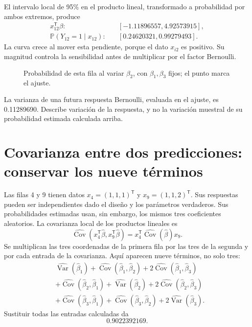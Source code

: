\documentclass[11pt,a4paper]{article}
\newcommand{\Prob}{\mathbb P}
\newcommand{\T}{^{\mathsf T}}
\DeclareMathOperator{\Var}{Var}
\DeclareMathOperator{\Cov}{Cov}
\begin{document}
El intervalo local de 95\% en el producto lineal,
transformado a probabilidad por ambos extremos, produce
\[
\begin{aligned}
x_{12}\T\beta:&\quad[-1.11896557,4.92573915],\\\Prob(Y_{12}=1\mid x_{12}):&\quad[0.24620321,0.99279493].\end{aligned}
\]
La curva crece al mover esta pendiente, porque el dato $x_{i2}$ es positivo. Su magnitud controla la sensibilidad antes de multiplicar por el factor Bernoulli.
\begin{figure}[H]\centering
{}
\caption{Probabilidad de esta fila al variar \(\beta_2\), con \(\beta_1,\beta_3\) fijos; el punto marca el ajuste.}
\end{figure}

La varianza de una futura respuesta Bernoulli,
evaluada en el ajuste, es 0.11289690.
Describe variación de la respuesta, y no la variación
muestral de su probabilidad estimada calculada arriba.
\endgroup

\clearpage
\section{Covarianza entre dos predicciones: conservar los nueve términos}\label{logit122}
Las filas 4 y 9 tienen datos \(x_4=(1,1,1)\T\) y
\(x_9=(1,1,2)\T\). Sus respuestas pueden ser independientes
dado el diseño y los parámetros verdaderos.
Sus probabilidades estimadas usan, sin embargo,
los mismos tres coeficientes aleatorios.
La covarianza local de los productos lineales es
\[
\widehat{\Cov}(x_4\T\widehat\beta,x_9\T\widehat\beta)
=x_4\T\widehat{\Cov}(\widehat\beta)x_9.
\]
Se multiplican las tres coordenadas de la primera fila
por las tres de la segunda y por cada entrada de la covarianza.
Aquí aparecen nueve términos, no solo tres:
\[
\begin{aligned}
&\widehat{\Var}(\widehat\beta_1)
+\widehat{\Cov}(\widehat\beta_1,\widehat\beta_2)
+2\widehat{\Cov}(\widehat\beta_1,\widehat\beta_3)\\
&+\widehat{\Cov}(\widehat\beta_2,\widehat\beta_1)
+\widehat{\Var}(\widehat\beta_2)
+2\widehat{\Cov}(\widehat\beta_2,\widehat\beta_3)\\
&+\widehat{\Cov}(\widehat\beta_3,\widehat\beta_1)
+\widehat{\Cov}(\widehat\beta_3,\widehat\beta_2)
+2\widehat{\Var}(\widehat\beta_3).
\end{aligned}
\]
Sustituir todas las entradas calculadas da
\[
0.9022392169.
\]
\end{document}
